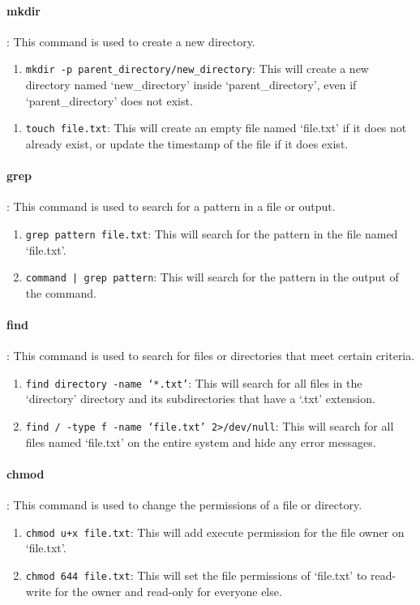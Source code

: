 \documentclass[10pt, a4paper]{article}
\begin{document}
\paragraph{mkdir}: This command is used to create a new directory.
\begin{enumerate}
    \item \texttt{mkdir -p parent\_directory/new\_directory}: This will create a new directory named `new\_directory' inside `parent\_directory', even if `parent\_directory' does not exist.
\end{enumerate}

\begin{enumerate}
    \item \texttt{touch file.txt}: This will create an empty file named `file.txt' if it does not already exist, or update the timestamp of the file if it does exist.
\end{enumerate}

\paragraph{grep}: This command is used to search for a pattern in a file or output.
\begin{enumerate}
    \item \texttt{grep pattern file.txt}: This will search for the pattern in the file named `file.txt'.
    \item \texttt{command | grep pattern}: This will search for the pattern in the output of the command.
\end{enumerate}

\paragraph{find}: This command is used to search for files or directories that meet certain criteria.
\begin{enumerate}
    \item \texttt{find directory -name `*.txt'}: This will search for all files in the `directory' directory and its subdirectories that have a `.txt' extension.
    \item \texttt{find / -type f -name `file.txt' 2>/dev/null}: This will search for all files named `file.txt' on the entire system and hide any error messages.
\end{enumerate}

\paragraph{chmod}: This command is used to change the permissions of a file or directory.
\begin{enumerate}
    \item \texttt{chmod u+x file.txt}: This will add execute permission for the file owner on `file.txt'.
    \item \texttt{chmod 644 file.txt}: This will set the file permissions of `file.txt' to read-write for the owner and read-only for everyone else.
\end{enumerate}
\end{document}
